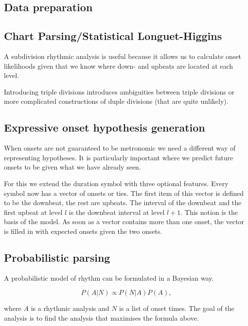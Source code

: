 \subsection{Data preparation}


\subsection{Chart Parsing/Statistical Longuet-Higgins}
\label{sec:chart}

A subdivision rhythmic analysis is useful because it allows us to calculate onset likelihoods given that we know where down- and upbeats are located at each level.

Introducing triple divisions introduces ambiguities between triple divisions or more complicated constructions of duple divisions (that are quite unlikely).







\subsection{Expressive onset hypothesis generation}

When onsets are not guaranteed to be metronomic we need a different way of representing hypotheses. It is particularly important where we predict future onsets to be given what we have already seen.

For this we extend the duration symbol with three optional features. Every symbol now has a vector of onsets or ties. The first item of this vector is defined to be the downbeat, the rest are upbeats. The interval of the downbeat and the first upbeat at level $l$ is the downbeat interval at level $l+1$. This notion is the basis of the model. As soon as a vector contains more than one onset, the vector is filled in with expected onsets given the two onsets.
\subsection*{Probabilistic parsing}

A probabilistic model of rhythm can be formulated in a Bayesian way. 

\begin{equation}
\label{eq:model}
P(A|N) \propto P(N|A)P(A),
\end{equation}

where $A$ is a rhythmic analysis and $N$ is a list of onset times. The goal of the analysis is to find the analysis that maximises the formula above.

